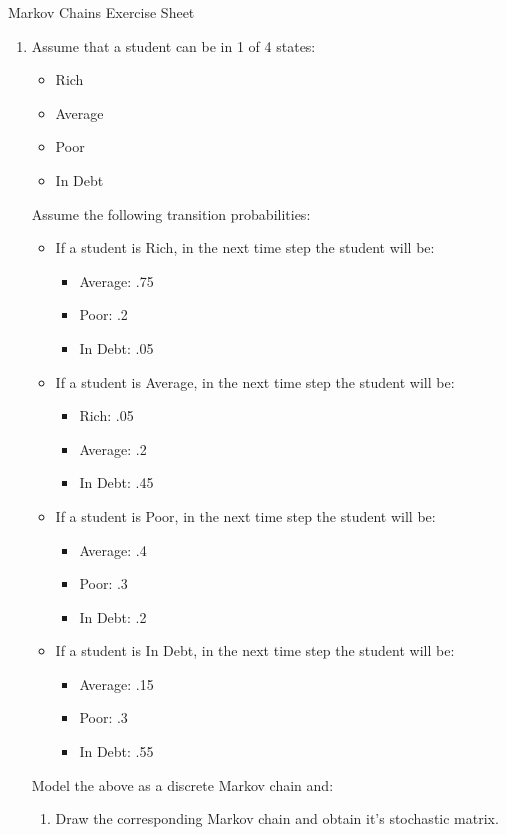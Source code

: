 \documentclass[12pt]{article}
\begin{document}
\begin{center}
\Huge{Markov Chains Exercise Sheet}\\
\date{\tiny{Last updated: \today.}}
\end{center}

\begin{enumerate}
\item Assume that a student can be in 1 of 4 states:
\begin{itemize}
	\item Rich
	\item Average
	\item Poor
	\item In Debt
\end{itemize}
Assume the following transition probabilities:

\begin{itemize}
	\item If a student is Rich, in the next time step the student will be:
	\begin{itemize}
		\item Average: .75
		\item Poor: .2
		\item In Debt: .05
	\end{itemize}
	\item If a student is Average, in the next time step the student will be:
	\begin{itemize}
		\item Rich: .05
		\item Average: .2
		\item In Debt: .45
	\end{itemize}
	\item If a student is Poor, in the next time step the student will be:
	\begin{itemize}
		\item Average: .4
		\item Poor: .3
		\item In Debt: .2
	\end{itemize}
	\item If a student is In Debt, in the next time step the student will be:
	\begin{itemize}
		\item Average: .15
		\item Poor: .3
		\item In Debt: .55
	\end{itemize}
\end{itemize}Model the above as a discrete Markov chain and:
\begin{enumerate}
	\item Draw the corresponding Markov chain and obtain it's stochastic matrix.


\end{enumerate}
\end{enumerate}
\end{document}
